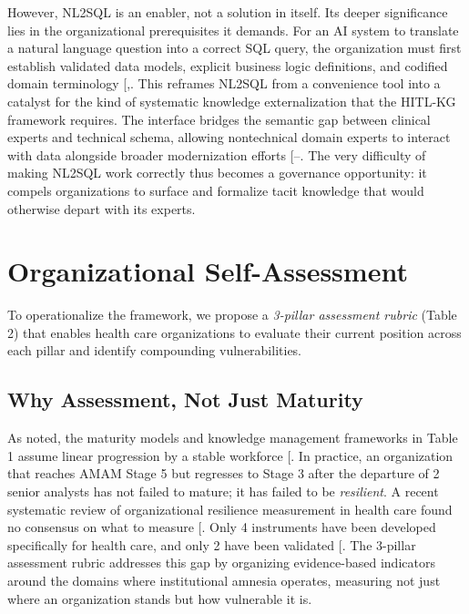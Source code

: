 \documentclass[
  american,
  11pt,
  letterpaper,
  oneside  ,captions=tableheading
]{scrartcl}
\begin{document}
However, NL2SQL is an enabler, not a solution in itself. Its deeper
significance lies in the organizational prerequisites it demands. For an
AI system to translate a natural language question into a correct SQL
query, the organization must first establish validated data models,
explicit business logic definitions, and codified domain terminology
{[},\citeproc{ref-zhang2024}{4}{]}. This
reframes NL2SQL from a convenience tool into a catalyst for the kind of
systematic knowledge externalization that the HITL-KG framework
requires. The interface bridges the semantic gap between clinical
experts and technical schema, allowing nontechnical domain experts to
interact with data alongside broader modernization efforts
{[}--\citeproc{ref-arora2025}{64}{]}.
The very difficulty of making NL2SQL work correctly thus becomes a
governance opportunity: it compels organizations to surface and
formalize tacit knowledge that would otherwise depart with its experts.

\section{Organizational
Self-Assessment}\label{organizational-self-assessment}

To operationalize the framework, we propose a \emph{3-pillar assessment
rubric} (Table 2) that enables health care organizations to evaluate
their current position across each pillar and identify compounding
vulnerabilities.

\subsection{Why Assessment, Not Just
Maturity}\label{why-assessment-not-just-maturity}

As noted, the maturity models and knowledge management frameworks in
Table 1 assume linear progression by a stable workforce
{[}\citeproc{ref-himss2024}{1}{]}. In practice, an organization that
reaches AMAM Stage 5 but regresses to Stage 3 after the departure of 2
senior analysts has not failed to mature; it has failed to be
\emph{resilient}. A recent systematic review of organizational
resilience measurement in health care found no consensus on what to
measure {[}\citeproc{ref-ignatowicz2023}{65}{]}. Only 4 instruments have
been developed specifically for health care, and only 2 have been
validated {[}\citeproc{ref-ratliff2025}{66}{]}. The 3-pillar assessment
rubric addresses this gap by organizing evidence-based indicators around
the domains where institutional amnesia operates, measuring not just
where an organization stands but how vulnerable it is.
\end{document}
